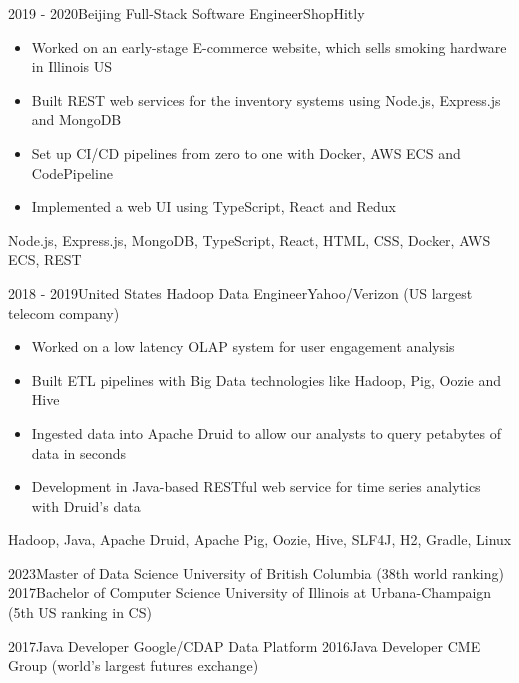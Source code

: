 \documentclass[localFont,alternative]{resume_template}
\begin{document}
\begin{experiences}
    \emptySeparator

    \experience
    {2019 - 2020}{Beijing}
    {Full-Stack Software Engineer}{ShopHitly}
    {
        \begin{itemize}
        \item Worked on an early-stage E-commerce website, which sells smoking hardware in Illinois US
        \item Built REST web services for the inventory systems using Node.js, Express.js and MongoDB
        \item Set up CI/CD pipelines from zero to one with Docker, AWS ECS and CodePipeline
        \item Implemented a web UI using TypeScript, React and Redux
        \end{itemize}
    }
    {Node.js, Express.js, MongoDB, TypeScript, React, HTML, CSS, Docker, AWS ECS, REST}

    \emptySeparator

    \experience
    {2018 - 2019}{United States}
    {Hadoop Data Engineer}{Yahoo/Verizon (US largest telecom company)}
    {
        \begin{itemize}
        \item Worked on a low latency OLAP system for user engagement analysis
        \item Built ETL pipelines with Big Data technologies like Hadoop, Pig, Oozie and Hive
        \item Ingested data into Apache Druid to allow our analysts to query petabytes of data in seconds
        \item Development in Java-based RESTful web service for time series analytics with Druid's data
        \end{itemize}
    }
    {Hadoop, Java, Apache Druid, Apache Pig, Oozie, Hive, SLF4J, H2, Gradle, Linux}

    \end{experiences}

    \twocolumnsection
    {
        \begin{internships}
            \internship
            {2023}{Master of Data Science}
            {University of British Columbia (38th world ranking)}
            \vspace{5pt}
            \internship
            {2017}{Bachelor of Computer Science}
            {University of Illinois at Urbana-Champaign (5th US ranking in CS)}
        \end{internships}
    }
    {
        \begin{internships}
            \internship
            {2017}{Java Developer}
            {Google/CDAP Data Platform}
            \vspace{5pt}
            \internship
            {2016}{Java Developer}
            {CME Group (world's largest futures exchange)}
        \end{internships}
    }
\end{document}
